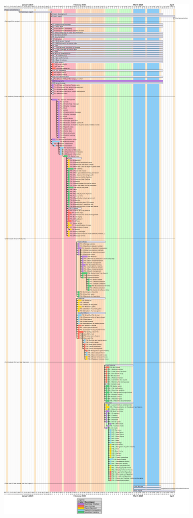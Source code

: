 \documentclass{article}
\begin{document}
\begin{center}
    \includegraphics[width=\textwidth,height=\textheight,keepaspectratio]{gantt3}
\end{center}
\end{document}
